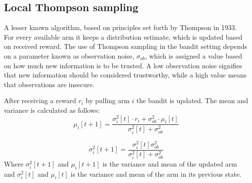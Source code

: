\subsection{Local Thompson sampling}
A lesser known algorithm, based on principles set forth by Thompson in 1933. 
For every available arm it keeps a distribution estimate, which is 
updated based on received reward. The use of Thompson sampling in the bandit 
setting depends on a parameter known as observation noise, $\sigma_{ob}$, which 
is assigned a value based on how much new information is to be trusted. A low 
observation noise signifies that new information should be considered 
trustworthy, while a high value means that observations are insecure. 

After receiving a reward $r_i$ by pulling arm $i$ the bandit is updated. The mean and variance
is calculated as follows:
\begin{displaymath}
\mu_i [t + 1] = \frac{\sigma_i^2 [t] \cdot r_i + \sigma_{ob}^2 \cdot \mu_i [t]}{\sigma_i^2 [t] + \sigma_{ob}^2}
\end{displaymath}

\begin{displaymath}
\sigma_i^2 [t + 1] = \frac{\sigma_i^2 [t] \sigma_{ob}^2}{\sigma_i^2 [t] + \sigma_{ob}^2}
\end{displaymath}
Where $\sigma_i^2 [t + 1]$ and $\mu_i [t + 1]$ is the variance and mean of the updated arm and
$\sigma_i^2 [t]$ and $\mu_i [t]$ is the variance and mean of the arm in its previous state.

